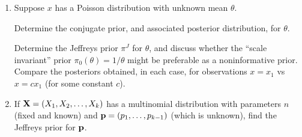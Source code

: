 \documentclass[12pt]{article}
\def\t{\theta}
\begin{document}
\begin{enumerate}
\item Suppose $x$ has a Poisson distribution with unknown mean $\t$.

Determine the conjugate prior, and associated posterior distribution, for $\t$.

Determine the Jeffreys prior $\pi^J$ for $\t$, and discuss whether the ``scale invariant'' prior $\pi_0(\t) = 1/\t$ might be preferable as a noninformative prior.
Compare the posteriors obtained, in each case, for observations $x=x_1$ vs $x=cx_1$ (for some constant $c$).


\item If ${\bf X}=(X_1,X_2,\ldots, X_k)$ has a
multinomial distribution with parameters $n$ (fixed and known) and ${\bf p}=(p_1, \ldots,
p_{k-1})$ (which is unknown), find the Jeffreys prior for $\bf p$. 




\end{enumerate}
\end{document}
